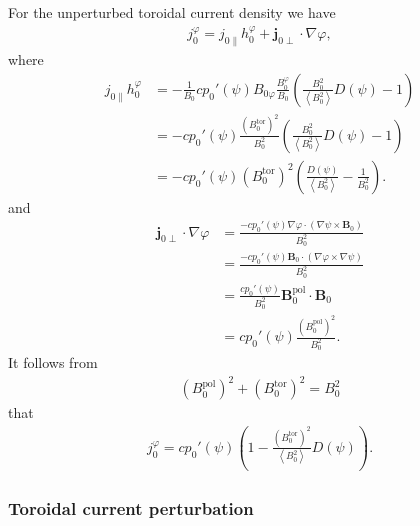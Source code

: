 \documentclass[a4paper, 10pt, english]{article}
\let\temp\vartheta
\let\vartheta\theta
\let\theta\temp
\let\temp\varphi
\let\varphi\phi
\let\phi\temp
\let\vec\symbf
\newcommand*\pol{\ensuremath{\textrm{pol}}}  %
\newcommand*\tor{\ensuremath{\textrm{tor}}}  %
\begin{document}
For the unperturbed toroidal current density we have
\begin{gather}
  j_{0}^{\phi} = j_{0 \parallel} h_{0}^{\phi} + \vec{j}_{0 \perp} \cdot \nabla \phi,
\end{gather}
where
\begin{align}
  j_{0 \parallel} h_{0}^{\phi} &= -\frac{1}{B_{0}} c p_{0}'(\psi) B_{0 \phi} \frac{B_{0}^{\phi}}{B_{0}} \left( \frac{B_{0}^{2}}{\left\langle B_{0}^{2} \right\rangle} D(\psi) - 1 \right) \nonumber \\
  &= -c p_{0}'(\psi) \frac{\left( B_{0}^{\tor} \right)^{2}}{B_0^2} \left( \frac{B_{0}^{2}}{\left\langle B_{0}^{2} \right\rangle} D(\psi) - 1 \right) \nonumber \\
  &= -c p_{0}'(\psi) \left( B_{0}^{\tor} \right)^{2} \left( \frac{D(\psi)}{\left\langle B_{0}^{2} \right\rangle} - \frac{1}{B_{0}^{2}} \right).
\end{align}
and
\begin{align}
  \vec{j}_{0 \perp} \cdot \nabla \phi &= \frac{-c p_{0}'(\psi) \nabla \phi \cdot (\nabla \psi \times \vec{B}_{0})}{B_{0}^{2}} \nonumber \\
  &= \frac{-c p_{0}'(\psi) \vec{B}_{0} \cdot (\nabla \phi \times \nabla \psi)}{B_{0}^{2}} \\
  &= \frac{c p_{0}'(\psi)}{B_{0}^{2}} \vec{B}_{0}^{\pol} \cdot \vec{B}_{0} \nonumber \\
  &= c p_{0}'(\psi) \frac{\left( B_{0}^{\pol} \right)^{2}}{B_{0}^{2}}.
\end{align}
It follows from
\begin{gather}
  \left( B_{0}^{\pol} \right)^{2} + \left( B_{0}^{\tor} \right)^{2} = B_{0}^{2}
\end{gather}
that
\begin{gather}
  j_{0}^{\phi} = c p_{0}'(\psi) \left( 1 - \frac{\left( B_{0}^{\tor} \right)^{2}}{\left\langle B_{0}^{2} \right\rangle} D(\psi) \right).
\end{gather}

\subsubsection{Toroidal current perturbation}
\end{document}
